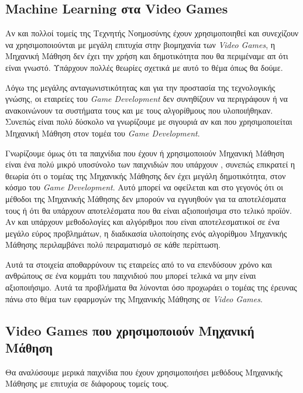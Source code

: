 \subsection{Machine Learning στα Video Games}
Αν και πολλοί τομείς της Τεχνητής Νοημοσύνης έχουν χρησιμοποιηθεί και συνεχίζουν να χρησιμοποιούνται με μεγάλη επιτυχία στην βιομηχανία των \textit{Video Games}, η Μηχανική Μάθηση δεν έχει την χρήση και δημοτικότητα που θα περιμέναμε απ ότι είναι γνωστό. Υπάρχουν πολλές θεωρίες σχετικά με αυτό το θέμα όπως θα δούμε. 
\par
Λόγω της μεγάλης ανταγωνιστικότητας και για την προστασία της τεχνολογικής γνώσης, οι εταιρείες του \textit{Game Development} δεν συνηθίζουν να περιγράφουν ή να ανακοινώνουν τα συστήματα τους και με τους αλγορίθμους που υλοποιήθηκαν. Συνεπώς είναι πολύ δύσκολο να γνωρίζουμε με σιγουριά αν και που χρησιμοποιείται Μηχανική Μάθηση στον τομέα του \textit{Game Development}.
\par
Γνωρίζουμε όμως ότι τα παιχνίδια που έχουν ή χρησιμοποιούν Μηχανική Μάθηση είναι ένα πολύ μικρό υποσύνολο των παιχνιδιών που υπάρχουν , συνεπώς επικρατεί η θεωρία ότι ο τομέας της Μηχανικής Μάθησης δεν έχει μεγάλη δημοτικότητα, στον κόσμο του \textit{Game Development}.  Αυτό μπορεί να οφείλεται και στο γεγονός ότι οι μέθοδοι της Μηχανικής Μάθησης δεν μπορούν να εγγυηθούν για τα αποτελέσματα τους ή ότι θα υπάρχουν αποτελέσματα που θα είναι αξιοποιήσιμα στο τελικό προϊόν. Αν και υπάρχουν μεθοδολογίες και αλγόριθμοι που είναι αποτελεσματικοί σε ένα μεγάλο εύρος προβλημάτων, η διαδικασία υλοποίησης ενός αλγορίθμου Μηχανικής Μάθησης περιλαμβάνει πολύ πειραματισμό σε κάθε περίπτωση.
\par
Αυτά τα στοιχεία αποθαρρύνουν τις εταιρείες από το να επενδύσουν χρόνο και ανθρώπους σε ένα κομμάτι του παιχνιδιού που μπορεί τελικά να μην είναι αξιοποιήσιμο. Αυτά τα προβλήματα θα λύνονται όσο προχωράει ο τομέας της έρευνας πάνω στο θέμα των εφαρμογών της Μηχανικής Μάθησης σε \textit{Video Games}.  \cite{mlandgames}

\subsection{Video Games που χρησιμοποιούν Μηχανική Μάθηση}
Θα αναλύσουμε μερικά παιχνίδια που έχουν χρησιμοποιήσει μεθόδους Μηχανικής Μάθησης με επιτυχία σε διάφορους τομείς τους.


